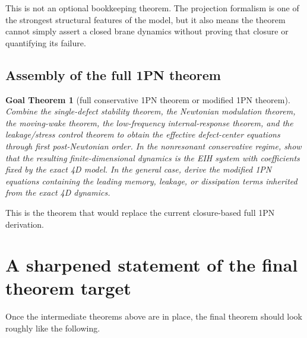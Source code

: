 \documentclass[11pt]{article}
\newtheorem{goal}{Goal Theorem}
\begin{document}
This is not an optional bookkeeping theorem. The projection formalism is one of the strongest structural features of the model, but it also means the theorem cannot simply assert a closed brane dynamics without proving that closure or quantifying its failure.

\subsection{Assembly of the full 1PN theorem}

\begin{goal}[full conservative 1PN theorem or modified 1PN theorem]
Combine the single-defect stability theorem, the Newtonian modulation theorem, the moving-wake theorem, the low-frequency internal-response theorem, and the leakage/stress control theorem to obtain the effective defect-center equations through first post-Newtonian order. In the nonresonant conservative regime, show that the resulting finite-dimensional dynamics is the EIH system with coefficients fixed by the exact 4D model. In the general case, derive the modified 1PN equations containing the leading memory, leakage, or dissipation terms inherited from the exact 4D dynamics.
\end{goal}

This is the theorem that would replace the current closure-based full 1PN derivation.

\section{A sharpened statement of the final theorem target}
\label{sec:mainstatement}

Once the intermediate theorems above are in place, the final theorem should look roughly like the following.
\end{document}
